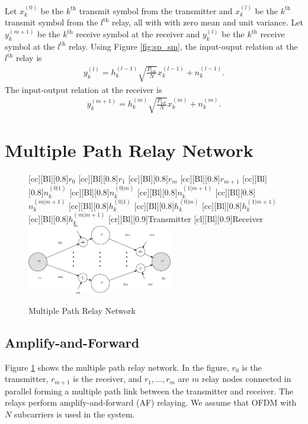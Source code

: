 \documentclass[conference]{IEEEtran}
\begin{document}
Let $x_k^{(0)}$ be the $k^{\mbox{th}}$ transmit symbol from the transmitter and  $x_k^{(l)}$ be the $k^{\mbox{th}}$ transmit symbol from the $l^{\mbox{th}}$ relay, all with with zero mean and unit variance.  Let $y_k^{(m+1)}$ be the $k^{\mbox{th}}$ receive symbol at the receiver and  $y_k^{(l)}$ be the $k^{\mbox{th}}$ receive symbol at the $l^{\mbox{th}}$ relay.  Using Figure \ref{fig:sp_sm}, the input-ouput relation at the $l^{\mbox{th}}$ relay is
\begin{eqnarray}
y_k^{(l)} = h_k^{(l-1)} \sqrt{\frac{P_{\mbox{tot}}}{N}} x_k^{(l-1)} + n_k^{(l-1)} \mbox{.}
\end{eqnarray}
The input-output relation at the receiver is
\begin{eqnarray}
y_k^{(m+1)} =h_k^{(m)}  \sqrt{\frac{P_{\mbox{tot}}}{N}} x_k^{(m)} + n_k^{(m)} \mbox{.}
\end{eqnarray}

\section{Multiple Path Relay Network}
\label{sec:mp}

\begin{figure}
  \centering
    [cc][Bl][0.8]{$r_0$}
    [cc][Bl][0.8]{$r_1$}
    [cc][Bl][0.8]{$r_m$}
    [cc][Bl][0.8]{$r_{m+1}$}
    [cc][Bl][0.8]{$n_k^{(0|1)}$}
    [cc][Bl][0.8]{$n_k^{(0|m)}$}
    [cc][Bl][0.8]{$n_k^{(1|m+1)}$}
    [cc][Bl][0.8]{$n_k^{(m|m+1)}$}
    [cc][Bl][0.8]{$h_k^{(0|1)}$}
    [cc][Bl][0.8]{$h_k^{(0|m)}$}
    [cc][Bl][0.8]{$h_k^{(1|m+1)}$}
    [cc][Bl][0.8]{$h_k^{(m|m+1)}$}
    [cr][Bl][0.9]{Transmitter}
    [cl][Bl][0.9]{Receiver}
    \includegraphics[width=2.5in]{mp_model.eps}
   \caption{Multiple Path Relay Network \label{fig:mp_sm} }
\end{figure}


\subsection{Amplify-and-Forward}
Figure \ref{fig:mp_sm} shows the multiple path relay network.  In the figure, $r_0$ is the transmitter, $r_{m+1}$ is the receiver, and $r_1, \ldots, r_m$ are $m$ relay nodes connected in parallel forming a multiple path link between the transmitter and receiver.  The relays perform amplify-and-forward (AF) relaying.  We assume that OFDM with $N$ subcarriers is used in the system.
\end{document}
